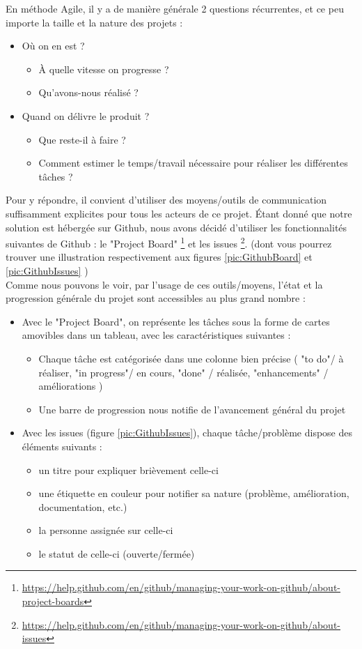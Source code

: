 En méthode Agile\cite{agileManifeste}, il y a de manière générale 2 questions récurrentes, et ce peu importe la taille et la nature des projets :
\begin{itemize}
    \item Où on en est ? 
    \begin{itemize}
        \item À quelle vitesse on progresse ?
        \item Qu'avons-nous réalisé ?
    \end{itemize}
    \item Quand on délivre le produit ?
    \begin{itemize}
        \item Que reste-il à faire ?
        \item Comment estimer le temps/travail nécessaire pour réaliser les différentes tâches ?
    \end{itemize}
\end{itemize}

Pour y répondre, il convient d'utiliser des moyens/outils de communication suffisamment explicites pour tous les acteurs de ce projet. Étant donné que notre solution est hébergée sur Github, nous avons décidé d'utiliser les fonctionnalités suivantes de Github : le "Project Board" \footnote{\url{https://help.github.com/en/github/managing-your-work-on-github/about-project-boards}} et les issues \footnote{\url{https://help.github.com/en/github/managing-your-work-on-github/about-issues}}. (dont vous pourrez trouver une illustration respectivement aux figures \ref{pic:GithubBoard} et \ref{pic:GithubIssues} )\\

Comme nous pouvons le voir, par l'usage de ces outils/moyens, l'état et la progression générale du projet sont accessibles au plus grand nombre : 
\begin{itemize}
    \item Avec le "Project Board", on représente les tâches sous la forme de cartes amovibles dans un tableau, avec les caractéristiques suivantes :
    \begin{itemize}
        \item Chaque tâche est catégorisée dans une colonne bien précise ( "to do"/ à réaliser, "in progress"/ en cours, "done" / réalisée, "enhancements" / améliorations  )
        \item Une barre de progression nous notifie de l'avancement général du projet
    \end{itemize}
    \item Avec les issues (figure \ref{pic:GithubIssues}), chaque tâche/problème dispose des éléments suivants : 
    \begin{itemize}
        \item un titre pour expliquer brièvement celle-ci
        \item une étiquette en couleur pour notifier sa nature (problème, amélioration, documentation, etc.)
        \item la personne assignée sur celle-ci
        \item le statut de celle-ci (ouverte/fermée)
    \end{itemize}
\end{itemize}


